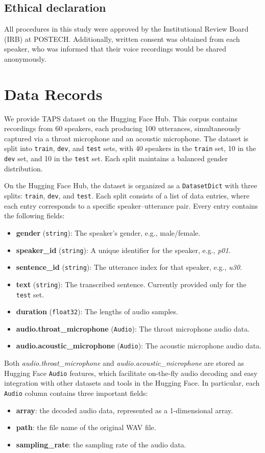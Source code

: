 \documentclass[10pt]{wlscirep}
\begin{document}
\subsection*{Ethical declaration}
All procedures in this study were approved by the Institutional Review Board (IRB) at POSTECH. Additionally, written consent was obtained from each speaker, who was informed that their voice recordings would be shared anonymously.

\section*{Data Records}
We provide TAPS dataset on the Hugging Face Hub\cite{TAPS}. This corpus contains recordings from 60 speakers, each producing 100 utterances, simultaneously captured via a throat microphone and an acoustic microphone. The dataset is split into \texttt{train}, \texttt{dev}, and \texttt{test} sets, with 40 speakers in the \texttt{train} set, 10 in the \texttt{dev} set, and 10 in the \texttt{test} set. Each split maintains a balanced gender distribution.

On the Hugging Face Hub, the dataset is organized as a \texttt{DatasetDict} with three splits: \texttt{train}, \texttt{dev}, and \texttt{test}. Each split consists of a list of data entries, where each entry corresponds to a specific speaker--utterance pair. Every entry contains the following fields:
\begin{itemize}
    \item \textbf{gender} (\texttt{string}): The speaker’s gender, e.g., male/female.
    \item \textbf{speaker\_id} (\texttt{string}): A unique identifier for the speaker, e.g., \textit{p01}.
    \item \textbf{sentence\_id} (\texttt{string}): The utterance index for that speaker, e.g., \textit{u30}.
    \item \textbf{text} (\texttt{string}): The transcribed sentence. Currently provided only for the \texttt{test} set.
    \item \textbf{duration} (\texttt{float32}): The lengths of audio samples.
    \item \textbf{audio.throat\_microphone} (\texttt{Audio}): The throat microphone audio data.
    \item \textbf{audio.acoustic\_microphone} (\texttt{Audio}): The acoustic microphone audio data.
\end{itemize}

Both \textit{audio.throat\_microphone} and \textit{audio.acoustic\_microphone} are stored as Hugging Face \texttt{Audio} features, which facilitate on-the-fly audio decoding and easy integration with other datasets and tools in the Hugging Face.
In particular, each \texttt{Audio} column contains three important fields: 
\begin{itemize}
    \item \textbf{array}: the decoded audio data, represented as a 1-dimensional array. 
    \item \textbf{path}: the file name of the original WAV file.
    \item \textbf{sampling\_rate}: the sampling rate of the audio data.
\end{itemize}
\end{document}
